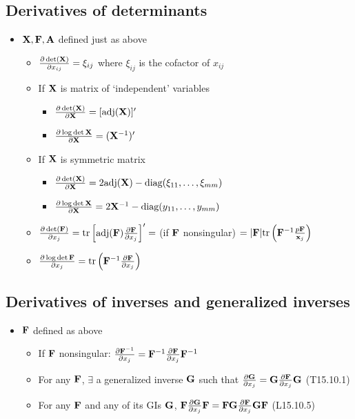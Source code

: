 \documentclass[a4paper, oneside]{book}
\begin{document}
\subsection*{Derivatives of determinants}
\begin{itemize}
\item $\mathbf{X}, \mathbf F, \mathbf A$ defined just as above
	\begin{itemize}
	\item $\frac{\partial\det(\mathbf{X})}{\partial x_{ij}} = \xi_{ij}$ where $\xi_{ij}$ is the cofactor of $x_{ij}$
	\item If $\mathbf X$ is matrix of `independent' variables
		\begin{itemize}	
		\item $\frac{\partial\det(\mathbf{X})}{\partial \mathbf{X}} = [\text{adj}(\mathbf{X})]'$
		\item $\frac{\partial \log\det \mathbf X}{\partial \mathbf X} = (\mathbf{X}^{-1})'$
		\end{itemize}
	\item If $\mathbf X$ is symmetric matrix
		\begin{itemize}
		\item $\frac{\partial\det(\mathbf{X})}{\partial \mathbf{X}} = 2 \text{adj}(\mathbf{X}) - \text{diag}(\xi_{11}, \hdots, {\xi_{mm}})$
		\item $\frac{\partial \log\det \mathbf X}{\partial \mathbf X} = 2\mathbf{X}^{-1} - \text{diag}(y_{11}, \hdots, y_{mm}) $		
		\end{itemize}

	\item $\frac{\partial\det(\mathbf{F})}{\partial x_j} = \text{tr}\left[\text{adj}(\mathbf{F})\frac{\partial\mathbf F}{\partial x_j}\right]' = $ (if $\mathbf F$ nonsingular) $ = |\mathbf F| \text{tr}\left( \mathbf{F}^{-1} \frac{p \mathbf F}{\mathbf x_j} \right) $
	\item $\frac{\partial \log\det \mathbf F}{\partial x_j} = \text{tr}\left(\mathbf F^{-1}\frac{\partial \mathbf F}{\partial x_j}\right)$
	\end{itemize}
\end{itemize}

\subsection*{Derivatives of inverses and generalized inverses}
\begin{itemize}
\item $\mathbf F $ defined as above
	\begin{itemize}
	\item If $\mathbf F$ nonsingular: $\frac{\partial \mathbf{F}^{-1}}{\partial x_j} = \mathbf F^{-1} \frac{\partial \mathbf F}{\partial x_j} \mathbf F^{-1} $
	\item For any $\mathbf F$, $\exists$ a generalized inverse $\mathbf {G}$ such that $\frac{\partial \mathbf{G}}{\partial x_j} = \mathbf G \frac{\partial \mathbf F}{\partial x_j} \mathbf G $ (T15.10.1)
	\item For any $\mathbf F$ and any of its GIs $\mathbf G$, $\mathbf F \frac{\partial \mathbf{G}}{\partial x_j} \mathbf F  = \mathbf F \mathbf G \frac{\partial \mathbf F}{\partial x_j} \mathbf G \mathbf F $ (L15.10.5)
	\end{itemize}

\end{itemize}
\end{document}
